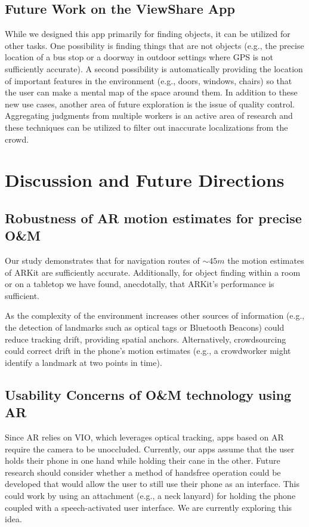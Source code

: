 \documentclass[chi_draft]{sigchi}
\newcommand{\OM}{O\&M\xspace}
\begin{document}
\subsection{Future Work on the ViewShare App}
While we designed this app primarily for finding objects, it can be utilized for other tasks.  One possibility is finding things that are not objects (e.g., the precise location of a bus stop or a doorway in outdoor settings where GPS is not sufficiently accurate).  A second possibility is automatically providing the location of important features in the environment (e.g., doors, windows, chairs) so that the user can make a mental map of the space around them.  In addition to these new use cases, another area of future exploration is the issue of quality control.  Aggregating judgments from multiple workers is an active area of research and these techniques can be utilized to filter out inaccurate localizations from the crowd.

\section{Discussion and Future Directions}


\subsection{Robustness of AR motion estimates for precise \OM} Our study demonstrates that for navigation routes of $\sim45m$ the motion estimates of ARKit are sufficiently accurate.  Additionally, for object finding within a room or on a tabletop we have found, anecdotally, that ARKit's performance is sufficient.

As the complexity of the environment increases other sources of information (e.g., the detection of landmarks such as optical tags or Bluetooth Beacons) could reduce tracking drift, providing spatial anchors.  Alternatively, crowdsourcing could correct drift in the phone's motion estimates (e.g., a crowdworker might identify a landmark at two points in time).

\subsection{Usability Concerns of \OM technology using AR}
Since AR relies on VIO, which leverages optical tracking, apps based on AR require the camera to be unoccluded.  Currently, our apps assume that the user holds their phone in one hand while holding their cane in the other.  Future research should consider whether a method of handsfree operation could be developed that would allow the user to still use their phone as an interface.  This could work by using an attachment (e.g., a neck lanyard) for holding the phone coupled with a speech-activated user interface.  We are currently exploring this idea.
\end{document}
